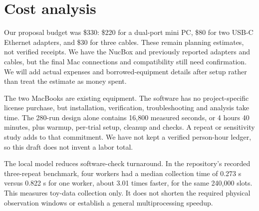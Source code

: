 \section{Cost analysis}
Our proposal budget was \$330: \$220 for a dual-port mini PC, \$80 for two
USB-C Ethernet adapters, and \$30 for three cables. These remain planning
estimates, not verified receipts. We have the NucBox and previously reported
adapters and cables, but the final Mac connections and compatibility still
need confirmation. We will add actual expenses and borrowed-equipment details
after setup rather than treat the estimate as money spent.

The two MacBooks are existing equipment. The software has no project-specific
license purchase, but installation, verification, troubleshooting and analysis
take time. The 280-run design alone contains 16,800 measured seconds, or
4 hours 40 minutes, plus warmup, per-trial setup, cleanup and checks. A repeat
or sensitivity study adds to that commitment. We have not kept a verified
person-hour ledger, so this draft does not invent a labor total.

The local model reduces software-check turnaround. In the repository's recorded
three-repeat benchmark, four workers had a median collection time of 0.273 s
versus 0.822 s for one worker, about 3.01 times faster, for the same 240,000
slots. This measures toy-data collection only. It does not shorten the required
physical observation windows or establish a general multiprocessing speedup.
